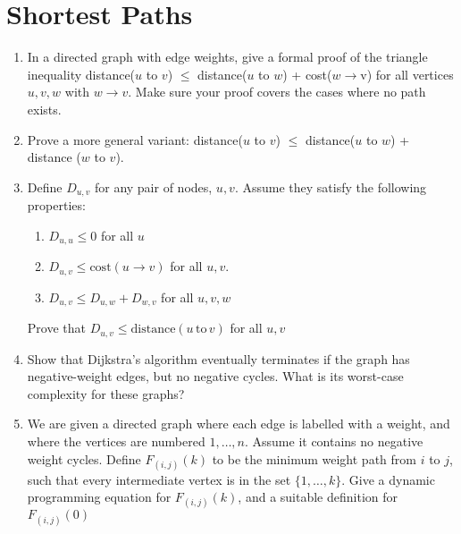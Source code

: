 \documentclass{article}
\begin{document}
\section{Shortest Paths}

\begin{enumerate}
    \item In a directed graph with edge weights, give a formal proof of the triangle inequality
distance($u$ to $v$) $\leq$ distance($u$ to $w$) + cost($w \rightarrow $v) for all vertices $u,v,w$ with $w \rightarrow v$.
Make sure your proof covers the cases where no path exists.
\item Prove a more general variant: distance($u$ to $v$) $\leq$ distance($u$ to $w$) + distance ($w$ to $v$).

\item Define $D_{u,v}$ for any pair of nodes, $u,v$.
Assume they satisfy the following properties:
\begin{enumerate}
    \item $D_{u,u}\leq 0$ for all $u$
    \item $D_{u,v}\leq \mathrm{cost}(u\rightarrow v)$ for all $u,v$.
    \item $D_{u,v}\leq D_{u,w} + D_{w,v}$ for all $u,v,w$
\end{enumerate}

Prove that $D_{u,v} \leq \mathrm{distance}(u\,\mathrm{to}\,v )$ for all $u,v$


\item Show that Dijkstra's algorithm eventually terminates if the graph has negative-weight edges, but no negative cycles. What is its worst-case complexity for these graphs?

\item We are given a directed graph where each edge is labelled with a weight, and where the vertices are
numbered $1,\dots,n$. Assume it contains no negative weight cycles. Define $F_{(i,j)}(k)$ to be the minimum weight path from $i$
to $j$, such that every intermediate vertex is in the set $\{1,\dots,k\}$. Give a dynamic programming equation for $F_{(i,j)}(k)$, and a
suitable definition for $F_{(i,j)}(0)$
\end{enumerate}
\end{document}
